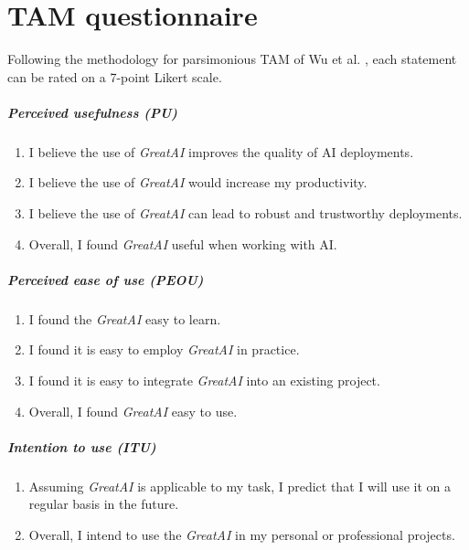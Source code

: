 \appendix
\chapter{TAM questionnaire} \label{appendix:questions}

Following the methodology for parsimonious TAM of Wu et al. \cite{wu2011user}, each statement can be rated on a 7-point Likert scale.

\paragraph{Perceived usefulness (PU)}
\begin{enumerate}
 \item I believe the use of \textit{GreatAI} improves the quality of AI deployments.
 \item I believe the use of \textit{GreatAI} would increase my productivity.
 \item I believe the use of \textit{GreatAI} can lead to robust and trustworthy deployments.
 \item Overall, I found \textit{GreatAI} useful when working with AI.
\end{enumerate}

\paragraph{Perceived ease of use (PEOU)}
\begin{enumerate}
 \item I found the  \textit{GreatAI} easy to learn.
 \item I found it is easy to employ \textit{GreatAI} in practice.
 \item I found it is easy to integrate \textit{GreatAI} into an existing project.
 \item Overall, I found \textit{GreatAI} easy to use.
\end{enumerate}

\paragraph{Intention to use (ITU)}
\begin{enumerate}
 \item Assuming \textit{GreatAI} is applicable to my task, I predict that I will use it on a regular basis in the future.
 \item Overall, I intend to use the \textit{GreatAI} in my personal or professional projects.
\end{enumerate}
